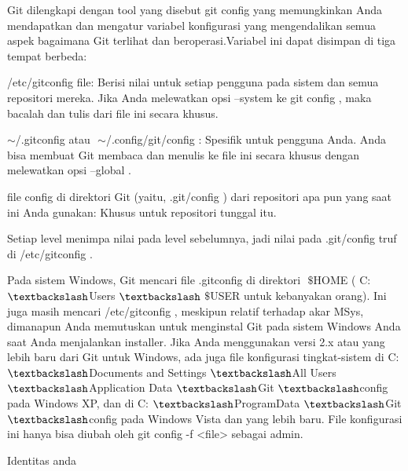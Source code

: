 \noindent 
Git dilengkapi dengan tool yang disebut $  $git config $  $yang memungkinkan Anda mendapatkan dan mengatur variabel konfigurasi yang mengendalikan semua aspek bagaimana Git terlihat dan beroperasi.Variabel ini dapat disimpan di tiga tempat berbeda: \par
\vspace{12pt}
\noindent 
/etc/gitconfig $  $file: Berisi nilai untuk setiap pengguna pada sistem dan semua repositori mereka. $  $Jika Anda melewatkan opsi $  $--system $  $ke $  $git config $  $, maka bacalah dan tulis dari file ini secara khusus. \par
\vspace{12pt}
\noindent 
 $  \sim  $/.gitconfig $  $atau $  $ $  \sim  $/.config/git/config $  $: Spesifik untuk pengguna Anda. $  $Anda bisa membuat Git membaca dan menulis ke file ini secara khusus dengan melewatkan opsi $  $--global $  $. \par
\vspace{12pt}
\noindent 
file $  $config $  $di direktori Git (yaitu, $  $.git/config $  $) dari repositori apa pun yang saat ini Anda gunakan: Khusus untuk repositori tunggal itu. \par
\vspace{12pt}
\noindent 
Setiap level menimpa nilai pada level sebelumnya, jadi nilai pada $  $.git/config $  $truf di $  $/etc/gitconfig $  $. \par
\vspace{12pt}
\noindent 
Pada sistem Windows, Git mencari file $  $.gitconfig $  $di direktori $  $ $  \$  $HOME $  $( $  $C: $  \textbackslash  $Users $  \textbackslash  $ $  \$  $USER $  $untuk kebanyakan orang). $  $Ini juga masih mencari $  $/etc/gitconfig $  $, meskipun relatif terhadap akar MSys, dimanapun Anda memutuskan untuk menginstal Git pada sistem Windows Anda saat Anda menjalankan installer. $  $Jika Anda menggunakan versi 2.x atau yang lebih baru dari Git untuk Windows, ada juga file konfigurasi tingkat-sistem di $  $C: $  \textbackslash  $Documents and Settings $  \textbackslash  $All Users $  \textbackslash  $Application Data $  \textbackslash  $Git $  \textbackslash  $config $  $pada Windows XP, dan di $  $C: $  \textbackslash  $ProgramData $  \textbackslash  $Git $  \textbackslash  $config $  $pada Windows Vista dan yang lebih baru. $  $File konfigurasi ini hanya bisa diubah oleh $  $git config -f <file> $  $sebagai admin. \par
\vspace{12pt}
\noindent 
Identitas anda \par
